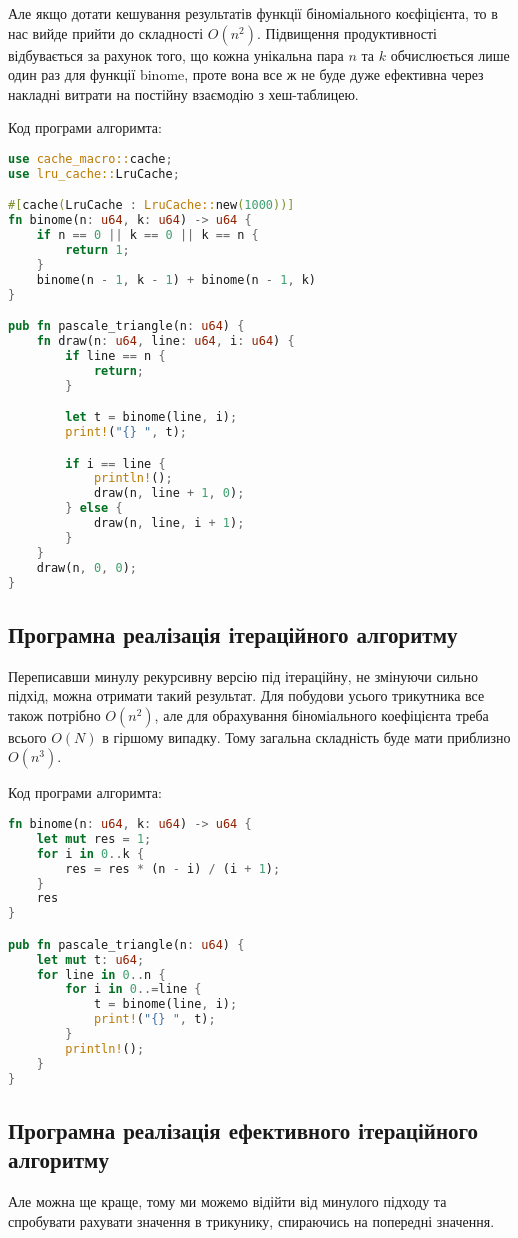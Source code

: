 Але якщо дотати кешування результатів функції біноміального коєфіцієнта, то в нас вийде прийти до складності $O(n^2)$.
Підвищення продуктивності відбувається за рахунок того, що кожна унікальна пара $n$ та $k$ обчислюється лише один раз для функції binome,
проте вона все ж не буде дуже ефективна через накладні витрати на постійну взаємодію з хеш-таблицею.

\noindent
Код програми алгоримта:
\begin{lstlisting}[language=Rust, style=colouredRust]
use cache_macro::cache;
use lru_cache::LruCache;

#[cache(LruCache : LruCache::new(1000))]
fn binome(n: u64, k: u64) -> u64 {
    if n == 0 || k == 0 || k == n {
        return 1;
    }
    binome(n - 1, k - 1) + binome(n - 1, k)
}

pub fn pascale_triangle(n: u64) {
    fn draw(n: u64, line: u64, i: u64) {
        if line == n {
            return;
        }

        let t = binome(line, i);
        print!("{} ", t);

        if i == line {
            println!();
            draw(n, line + 1, 0);
        } else {
            draw(n, line, i + 1);
        }
    }
    draw(n, 0, 0);
}
\end{lstlisting}


\newpage
\subsection{Програмна реалізація ітераційного алгоритму}
Переписавши минулу рекурсивну версію під ітераційну, не змінуючи сильно підхід, можна отримати такий результат.
Для побудови усього трикутника все також потрібно $O(n^2)$,
але для обрахування біноміального коефіцієнта треба всього $O(N)$ в гіршому випадку.
Тому загальна складність буде мати приблизно $O(n^3)$.

\noindent
Код програми алгоримта:
\begin{lstlisting}[language=Rust, style=colouredRust]
fn binome(n: u64, k: u64) -> u64 {
    let mut res = 1;
    for i in 0..k {
        res = res * (n - i) / (i + 1);
    }
    res
}

pub fn pascale_triangle(n: u64) {
    let mut t: u64;
    for line in 0..n {
        for i in 0..=line {
            t = binome(line, i);
            print!("{} ", t);
        }
        println!();
    }
}
\end{lstlisting}


\newpage
\subsection{Програмна реалізація ефективного ітераційного алгоритму}
Але можна ще краще, тому ми можемо відійти від минулого підходу та спробувати рахувати значення в трикунику,
спираючись на попередні значення.


